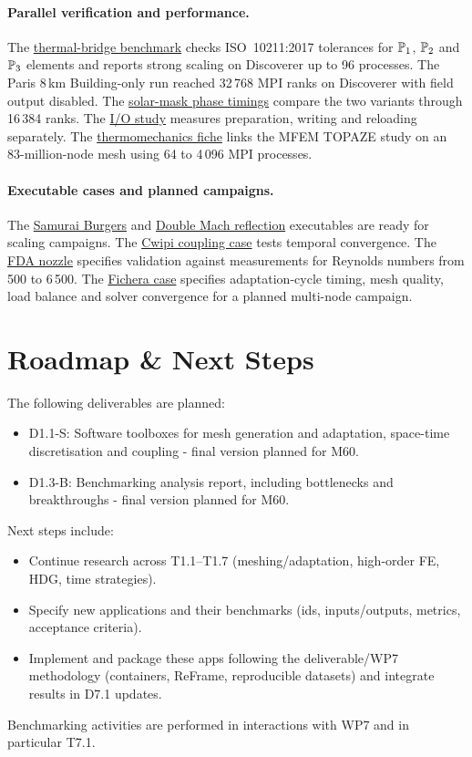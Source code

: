 \paragraph{Parallel verification and performance.}
The \hyperref[sec:app:specs:app-feelpp-discr-1]{thermal-bridge benchmark}
checks ISO~10211:2017 tolerances for $\mathbb{P}_1$, $\mathbb{P}_2$ and $\mathbb{P}_3$
elements and reports strong scaling on Discoverer up to 96 processes.
The Paris 8\,km Building-only run reached 32\,768 MPI ranks on Discoverer
with field output disabled. The
\hyperref[tab:Feelpp:solar-mask-discoverer]{solar-mask phase timings}
compare the two variants through 16\,384 ranks.
The \hyperref[sec:app:specs:app-feelpp-io]{I/O study}
measures preparation, writing and reloading separately.
The \hyperref[sec:app:specs:app-feelpp-thermomeca-1]{thermomechanics fiche}
links the MFEM TOPAZE study on an 83-million-node mesh using 64 to
4\,096 MPI processes.

\paragraph{Executable cases and planned campaigns.}
The \hyperref[sec:app:specs:app-samurai-burgers-2d]{Samurai Burgers}
and \hyperref[sec:app:specs:app-samurai-euler-dmr]{Double Mach reflection}
executables are ready for scaling campaigns. The
\hyperref[sec:app:specs:app-samurai-cwipi]{Cwipi coupling case} tests
temporal convergence. The
\hyperref[sec:app:specs:app-feelpp-discr-2]{FDA nozzle} specifies validation
against measurements for Reynolds numbers from 500 to 6\,500. The
\hyperref[sec:app:specs:app-freefem-parmmg]{Fichera case} specifies
adaptation-cycle timing, mesh quality, load balance and solver convergence
for a planned multi-node campaign.

\section{Roadmap \& Next Steps}

The following deliverables are planned:
\begin{itemize}
    \item D1.1-S: Software toolboxes for mesh generation and adaptation, space-time discretisation and coupling - final version planned for M60.
    \item D1.3-B: Benchmarking analysis report, including bottlenecks and breakthroughs - final version planned for M60.
\end{itemize}
Next steps include:
\begin{itemize}
    \item Continue research across T1.1--T1.7 (meshing/adaptation, high-order FE, HDG, time strategies).
    \item Specify new applications and their benchmarks (ids, inputs/outputs, metrics, acceptance criteria).
    \item Implement and package these apps following the deliverable/WP7 methodology (containers, ReFrame, reproducible datasets) and integrate results in D7.1 updates.
\end{itemize}
Benchmarking activities are performed in interactions with WP7 and in particular T7.1.

